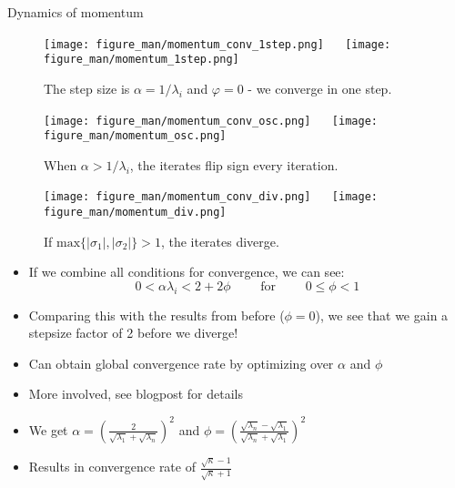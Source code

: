 \documentclass[11pt,compress,t,notes=noshow, xcolor=table]{beamer}
\begin{document}
\begin{vbframe}{Dynamics of momentum}
\framebreak
\vspace*{1.0cm}
\begin{figure}
	\texttt{[image: figure\_man/momentum\_conv\_1step.png]} ~~ \texttt{[image: figure\_man/momentum\_1step.png]} \\
	\begin{footnotesize} 
		The step size is $\alpha = 1/\lambda_i$ and $\varphi = 0$ - we converge in one step.
	\end{footnotesize}
\end{figure}
\framebreak
\vspace*{1.0cm}
\begin{figure}
	\texttt{[image: figure\_man/momentum\_conv\_osc.png]} ~~ \texttt{[image: figure\_man/momentum\_osc.png]} \\
	\begin{footnotesize} 
		When $\alpha > 1/\lambda_i$, the iterates flip sign every iteration. 
	\end{footnotesize}
\end{figure}
\framebreak
\vspace*{1.0cm}
\begin{figure}
	\texttt{[image: figure\_man/momentum\_conv\_div.png]} ~~ \texttt{[image: figure\_man/momentum\_div.png]} \\
	\begin{footnotesize} 
		If  $\text{max} \{|\sigma_1|, |\sigma_2| \} > 1$, the iterates diverge. 
	\end{footnotesize}
\end{figure}

\framebreak

\begin{itemize}
\item If we combine all conditions for convergence, we can see: 
$$ 0 < \alpha \lambda_i < 2  + 2\phi  \qquad \text{ for } \qquad 0 \leq \phi < 1$$
\item Comparing this with the results from before ($\phi=0$), we see that we gain a stepsize factor of 2 before we diverge!
\item Can obtain global convergence rate by optimizing over $\alpha$ and $\phi$
\item More involved, see blogpost for details
\item We get $\alpha = \left(\frac{2}{\sqrt{\lambda_1} + \sqrt{\lambda_n}}\right)^2 $
 and $\phi = \left(\frac{\sqrt{\lambda_n} - \sqrt{\lambda_1}}{\sqrt{\lambda_n} + \sqrt{\lambda_1}} \right)^2 $
\item Results in convergence rate of $\frac{\sqrt{\kappa}-1}{\sqrt{\kappa}+1}$
\end{itemize}
\framebreak


\end{vbframe}
\end{document}
